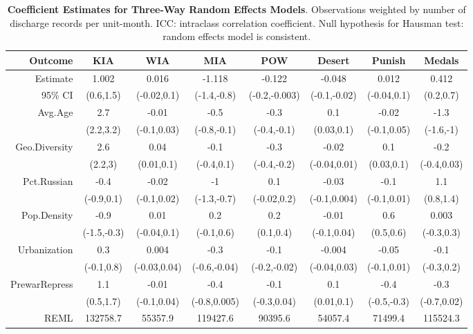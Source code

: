 \begin{table}[ht]
\centering
\caption{\textbf{Coefficient Estimates for Three-Way Random Effects Models}. Observations weighted by number of discharge records per unit-month. ICC:  intraclass correlation coefficient. Null hypothesis for Hausman test: random effects model is consistent.} 
\label{tab:re_pop}
\begingroup\footnotesize
\begin{tabular}{rccccccc}
 Outcome & \textbf{KIA} & \textbf{WIA} & \textbf{MIA} & \textbf{POW} & \textbf{Desert} & \textbf{Punish} & \textbf{Medals} \\ 
  \midrule
Estimate & 1.002 & 0.016 & -1.118 & -0.122 & -0.048 & 0.012 & 0.412 \\ 
  95\% CI & (0.6,1.5) & (-0.02,0.1) & (-1.4,-0.8) & (-0.2,-0.003) & (-0.1,-0.02) & (-0.04,0.1) & (0.2,0.7) \\ 
   \midrule
Avg.Age & 2.7 & -0.01 & -0.5 & -0.3 & 0.1 & -0.02 & -1.3 \\ 
   & (2.2,3.2) & (-0.1,0.03) & (-0.8,-0.1) & (-0.4,-0.1) & (0.03,0.1) & (-0.1,0.05) & (-1.6,-1) \\ 
  Geo.Diversity & 2.6 & 0.04 & -0.1 & -0.3 & -0.02 & 0.1 & -0.2 \\ 
   & (2.2,3) & (0.01,0.1) & (-0.4,0.1) & (-0.4,-0.2) & (-0.04,0.01) & (0.03,0.1) & (-0.4,0.03) \\ 
  Pct.Russian & -0.4 & -0.02 & -1 & 0.1 & -0.03 & -0.1 & 1.1 \\ 
   & (-0.9,0.1) & (-0.1,0.02) & (-1.3,-0.7) & (-0.02,0.2) & (-0.1,0.004) & (-0.1,0.01) & (0.8,1.4) \\ 
  Pop.Density & -0.9 & 0.01 & 0.2 & 0.2 & -0.01 & 0.6 & 0.003 \\ 
   & (-1.5,-0.3) & (-0.04,0.1) & (-0.1,0.6) & (0.1,0.4) & (-0.1,0.04) & (0.5,0.6) & (-0.3,0.3) \\ 
  Urbanization & 0.3 & 0.004 & -0.3 & -0.1 & -0.004 & -0.05 & -0.1 \\ 
   & (-0.1,0.8) & (-0.03,0.04) & (-0.6,-0.04) & (-0.2,-0.02) & (-0.04,0.03) & (-0.1,0.01) & (-0.3,0.2) \\ 
  PrewarRepress & 1.1 & -0.01 & -0.4 & -0.1 & 0.1 & -0.4 & -0.3 \\ 
   & (0.5,1.7) & (-0.1,0.04) & (-0.8,0.005) & (-0.3,0.04) & (0.01,0.1) & (-0.5,-0.3) & (-0.7,0.02) \\ 
   \midrule
REML & 132758.7 & 55357.9 & 119427.6 & 90395.6 & 54057.4 & 71499.4 & 115524.3 \\ 

\end{tabular}
\end{table}
